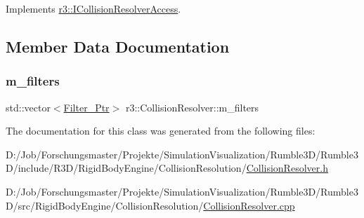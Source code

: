 Implements \mbox{\hyperlink{classr3_1_1_i_collision_resolver_access_a266dfbc4c421a7c3429ef474d63fd941}{r3\+::\+I\+Collision\+Resolver\+Access}}.



\subsection{Member Data Documentation}
\mbox{\label{classr3_1_1_collision_resolver_abf1234ad45ba7f114b31950c90ccaaff}} 
\subsubsection{\texorpdfstring{m\+\_\+filters}{m\_filters}}
{\footnotesize\ttfamily std\+::vector$<$\mbox{\hyperlink{classr3_1_1_collision_resolver_ad1c9ca40341498c0fe4d483d21c8eb9b}{Filter\+\_\+\+Ptr}}$>$ r3\+::\+Collision\+Resolver\+::m\+\_\+filters\hspace{0.3cm}{\ttfamily [protected]}}



The documentation for this class was generated from the following files\+:\begin{DoxyCompactItemize}
\item 
D\+:/\+Job/\+Forschungsmaster/\+Projekte/\+Simulation\+Visualization/\+Rumble3\+D/\+Rumble3\+D/include/\+R3\+D/\+Rigid\+Body\+Engine/\+Collision\+Resolution/\mbox{\hyperlink{_collision_resolver_8h}{Collision\+Resolver.\+h}}\item 
D\+:/\+Job/\+Forschungsmaster/\+Projekte/\+Simulation\+Visualization/\+Rumble3\+D/\+Rumble3\+D/src/\+Rigid\+Body\+Engine/\+Collision\+Resolution/\mbox{\hyperlink{_collision_resolver_8cpp}{Collision\+Resolver.\+cpp}}\end{DoxyCompactItemize}
